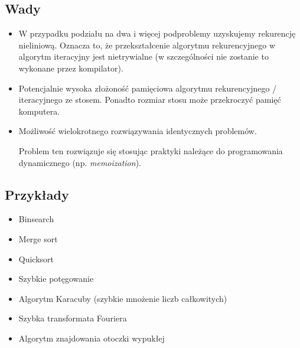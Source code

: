 \documentclass[12pt]{article}
\begin{document}
    \subsection{Wady}

    \begin{itemize}
        \item W przypadku podziału na dwa i więcej podproblemy uzyskujemy rekurencję nieliniową.
            Oznacza to, że przekształcenie algorytmu rekurencyjnego w algorytm iteracyjny 
            jest nietrywialne (w szczególności nie zostanie to wykonane przez
            kompilator). 

            
        \item Potencjalnie wysoka złożoność pamięciowa algorytmu rekurencyjnego / iteracyjnego ze stosem.
            Ponadto rozmiar stosu może przekroczyć pamięć komputera.


        \item Możliwość wielokrotnego rozwiązywania identycznych problemów.

            Problem ten rozwiązuje się stosując praktyki należące do programowania dynamicznego
            (np. \textit{memoization}).

    \end{itemize}

    \subsection{Przykłady}
    
    \begin{itemize}
        \item Binsearch
        \item Merge sort
        \item Quicksort
        \item Szybkie potęgowanie
        \item Algorytm Karacuby (szybkie mnożenie liczb całkowitych)
        \item Szybka transformata Fouriera
        \item Algorytm znajdowania otoczki wypukłej
    \end{itemize}

    
    \newpage
\end{document}
